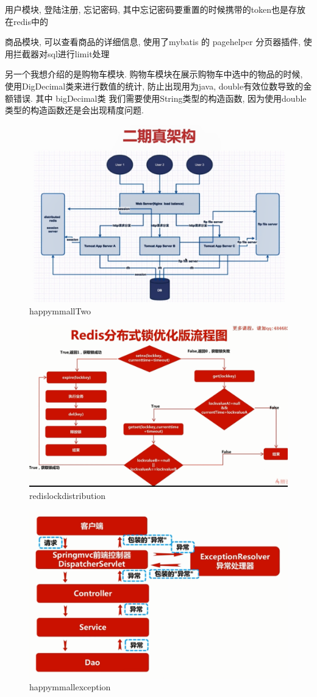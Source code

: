 \documentclass[UTF8]{ctexart}
\begin{document}
用户模块, 登陆注册, 忘记密码, 其中忘记密码要重置的时候携带的token也是存放在redis中的

商品模块, 可以查看商品的详细信息, 使用了mybatis 的 pagehelper 分页器插件, 使用拦截器对sql进行limit处理


另一个我想介绍的是购物车模块.
购物车模块在展示购物车中选中的物品的时候, 使用DigDecimal类来进行数值的统计, 防止出现用为java, double有效位数导致的金额错误. 其中 bigDecimal类 我们需要使用String类型的构造函数, 因为使用double类型的构造函数还是会出现精度问题.

\begin{figure}
	\centering
	\includegraphics[width=0.7\linewidth]{figures/happymmallTwo.png}
	\caption{happymmallTwo}
	\label{fig:happymmallTwo}
\end{figure}

\begin{figure}
	\centering
	\includegraphics[width=0.7\linewidth]{figures/redislockdistribution.png}
	\caption{redislockdistribution}
	\label{fig:redislockdistribution}
\end{figure}

\begin{figure}
	\centering
	\includegraphics[width=0.7\linewidth]{figures/happymmallexception.png}
	\caption{happymmallexception}
	\label{fig:happymmallexception}
\end{figure}
\end{document}
